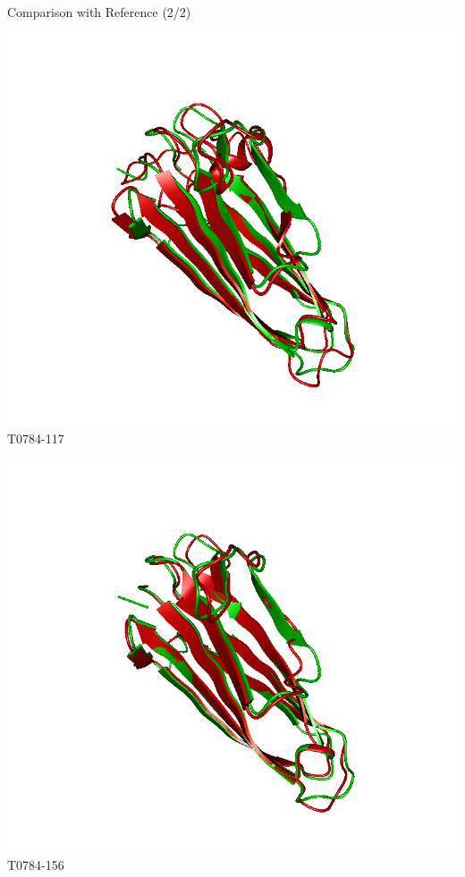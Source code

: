 \begin{frame}{Comparison with Reference (2/2)}
    \begin{center}
        \begin{minipage}{.45\textwidth}
            \includegraphics[width=\textwidth]{../report/figures/T0784TS117}\\
            {T0784-117}
        \end{minipage}
        \begin{minipage}{.45\textwidth}
            \includegraphics[width=\textwidth]{../report/figures/T0784TS156}\\
            {T0784-156}
        \end{minipage}
    \end{center}
\end{frame}
